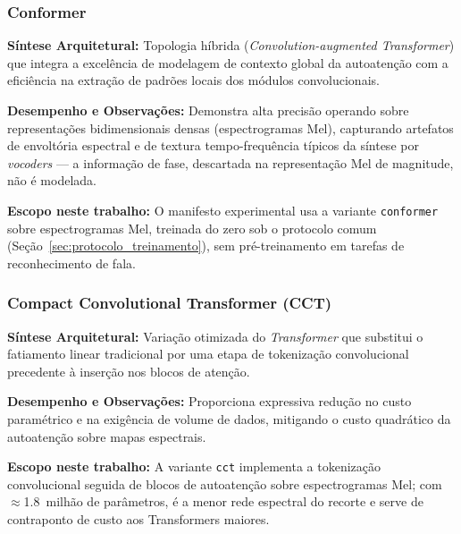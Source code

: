 \documentclass[12pt,a4paper]{article}
\begin{document}
\subsubsection*{Conformer \cite{gulati2020conformer}}
\textbf{Síntese Arquitetural:} Topologia híbrida (\textit{Convolution-augmented Transformer}) que integra a excelência de modelagem de contexto global da autoatenção com a eficiência na extração de padrões locais dos módulos convolucionais.
\par\textbf{Desempenho e Observações:} Demonstra alta precisão operando sobre representações bidimensionais densas (espectrogramas Mel), capturando artefatos de envoltória espectral e de textura tempo-frequência típicos da síntese por \textit{vocoders} --- a informação de fase, descartada na representação Mel de magnitude, não é modelada.
\par\textbf{Escopo neste trabalho:} O manifesto experimental usa a variante
\texttt{conformer} sobre espectrogramas Mel, treinada do zero sob o protocolo
comum (Seção~\ref{sec:protocolo_treinamento}), sem pré-treinamento em tarefas
de reconhecimento de fala.

\subsubsection*{Compact Convolutional Transformer (CCT) \cite{hassani2021cct}}
\textbf{Síntese Arquitetural:} Variação otimizada do \textit{Transformer} que substitui o fatiamento linear tradicional por uma etapa de tokenização convolucional precedente à inserção nos blocos de atenção.
\par\textbf{Desempenho e Observações:} Proporciona expressiva redução no custo paramétrico e na exigência de volume de dados, mitigando o custo quadrático da autoatenção sobre mapas espectrais.
\par\textbf{Escopo neste trabalho:} A variante \texttt{cct} implementa a
tokenização convolucional seguida de blocos de autoatenção sobre
espectrogramas Mel; com $\approx$\num{1,8}~milhão de parâmetros, é a menor
rede espectral do recorte e serve de contraponto de custo aos Transformers
maiores.
\end{document}
